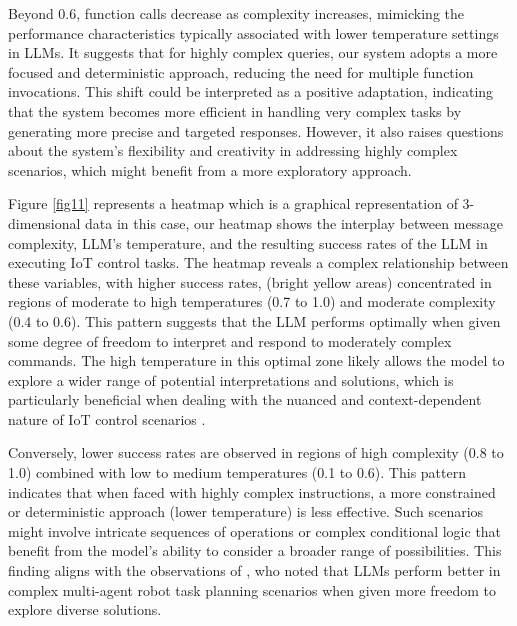 \documentclass[lettersize,journal]{IEEEtran}
\begin{document}
Beyond 0.6, function calls decrease as complexity increases, mimicking the performance characteristics typically associated with lower temperature settings in LLMs. It suggests that for highly complex queries, our system adopts a more focused and deterministic approach, reducing the need for multiple function invocations. This shift could be interpreted as a positive adaptation, indicating that the system becomes more efficient in handling very complex tasks by generating more precise and targeted responses. However, it also raises questions about the system's flexibility and creativity in addressing highly complex scenarios, which might benefit from a more exploratory approach.


Figure \ref{fig11} represents a heatmap which is a graphical representation of 3-dimensional data in this case, our heatmap shows the interplay between message complexity, LLM's temperature, and the resulting success rates of the LLM in executing IoT control tasks. The heatmap reveals a complex relationship between these variables, with higher success rates, (bright yellow areas) concentrated in regions of moderate to high temperatures (0.7 to 1.0) and moderate complexity (0.4 to 0.6). This pattern suggests that the LLM performs optimally when given some degree of freedom to interpret and respond to moderately complex commands. The high temperature in this optimal zone likely allows the model to explore a wider range of potential interpretations and solutions, which is particularly beneficial when dealing with the nuanced and context-dependent nature of IoT control scenarios \cite{10315791}. 

Conversely, lower success rates are observed in regions of high complexity (0.8 to 1.0) combined with low to medium temperatures (0.1 to 0.6). This pattern indicates that when faced with highly complex instructions, a more constrained or deterministic approach (lower temperature) is less effective. Such scenarios might involve intricate sequences of operations or complex conditional logic that benefit from the model's ability to consider a broader range of possibilities. This finding aligns with the observations of \citet{kannan2024smartllmsmartmultiagentrobot}, who noted that LLMs perform better in complex multi-agent robot task planning scenarios when given more freedom to explore diverse solutions. 
\end{document}
